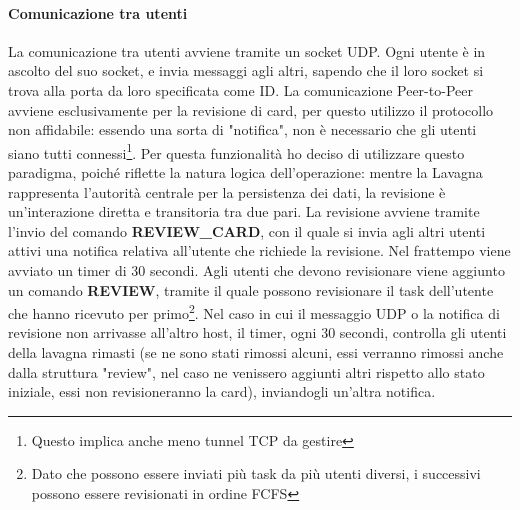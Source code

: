 \documentclass[11pt,a4paper,twocolumn,twoside]{paper}
\begin{document}
\paragraph{Comunicazione tra utenti}
     La comunicazione tra utenti avviene tramite un socket UDP. Ogni utente è in ascolto del suo socket, e invia messaggi agli altri, sapendo che il loro socket si trova alla porta da loro specificata come ID. La comunicazione Peer-to-Peer avviene esclusivamente per la revisione di card, per questo utilizzo il protocollo non affidabile: essendo una sorta di "notifica", non è necessario che gli utenti siano tutti connessi\footnote{Questo implica anche meno tunnel TCP da gestire}. Per questa funzionalità ho deciso di utilizzare questo paradigma, poiché riflette la natura logica dell'operazione: mentre la Lavagna rappresenta l'autorità centrale per la persistenza dei dati, la revisione è un'interazione diretta e transitoria tra due pari. La revisione avviene tramite l'invio del comando \textbf{REVIEW\_CARD}, con il quale si invia agli altri utenti attivi una notifica relativa all'utente che richiede la revisione. Nel frattempo viene avviato un timer di 30 secondi. Agli utenti che devono revisionare viene aggiunto un comando \textbf{REVIEW}, tramite il quale possono revisionare il task dell'utente che hanno ricevuto per primo\footnote{Dato che possono essere inviati più task da più utenti diversi, i successivi possono essere revisionati in ordine FCFS}. Nel caso in cui il messaggio UDP o la notifica di revisione non arrivasse all'altro host, il timer, ogni 30 secondi, controlla gli utenti della lavagna rimasti (se ne sono stati rimossi alcuni, essi verranno rimossi anche dalla struttura "review", nel caso ne venissero aggiunti altri rispetto allo stato iniziale, essi non revisioneranno la card), inviandogli un'altra notifica.
    
\end{document}
